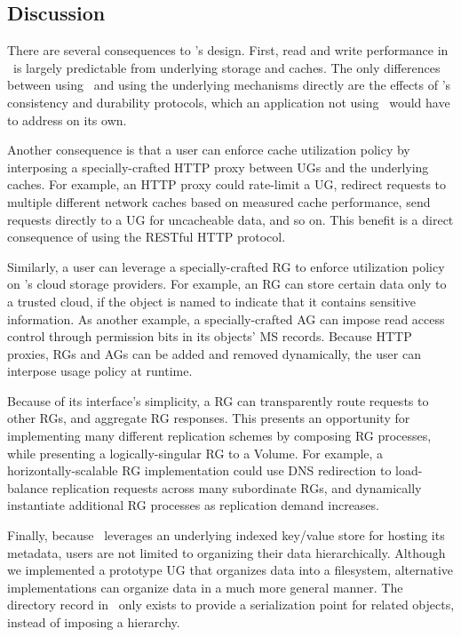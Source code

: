 \subsection{Discussion}

There are several consequences to \Syndicate's design. First, read and write performance in \Syndicate\ is largely predictable from underlying storage and caches. The only differences between using \Syndicate\ and using the underlying mechanisms directly are the effects of \Syndicate's consistency and durability protocols, which an application not using \Syndicate\ would have to address on its own.

Another consequence is that a user can enforce cache utilization policy by interposing a specially-crafted HTTP proxy between UGs and the underlying caches. For example, an HTTP proxy could rate-limit a UG, redirect requests to multiple different network caches based on measured cache performance, send requests directly to a UG for uncacheable data, and so on. This benefit is a direct consequence of using the RESTful HTTP protocol.

Similarly, a user can leverage a specially-crafted RG to enforce utilization policy on \Syndicate's cloud storage providers. For example, an RG can store certain data only to a trusted cloud, if the object is named to indicate that it contains sensitive information. As another example, a specially-crafted AG can impose read access control through permission bits in its objects' MS records. Because HTTP proxies, RGs and AGs can be added and removed dynamically, the user can interpose usage policy at runtime.

Because of its interface's simplicity, a RG can transparently route requests to other RGs, and aggregate RG responses. This presents an opportunity for implementing many different replication schemes by composing RG processes, while presenting a logically-singular RG to a Volume. For example, a horizontally-scalable RG implementation could use DNS redirection to load-balance replication requests across many subordinate RGs, and dynamically instantiate additional RG processes as replication demand increases.

Finally, because \Syndicate\ leverages an underlying indexed key/value store for hosting its metadata, users are not limited to organizing their data hierarchically.  Although we implemented a prototype UG that organizes data into a filesystem, alternative implementations can organize data in a much more general manner.  The directory record in \Syndicate\ only exists to provide a serialization point for related objects, instead of imposing a hierarchy.

